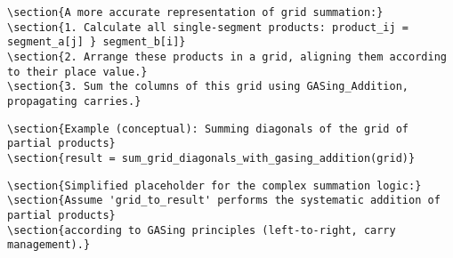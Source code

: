 \begin{verbatim}
\section{A more accurate representation of grid summation:}
\section{1. Calculate all single-segment products: product_ij = segment_a[j] } segment_b[i]}
\section{2. Arrange these products in a grid, aligning them according to their place value.}
\section{3. Sum the columns of this grid using GASing_Addition, propagating carries.}
\end{verbatim}

\begin{verbatim}
\section{Example (conceptual): Summing diagonals of the grid of partial products}
\section{result = sum_grid_diagonals_with_gasing_addition(grid)}
\end{verbatim}

\begin{verbatim}
\section{Simplified placeholder for the complex summation logic:}
\section{Assume 'grid_to_result' performs the systematic addition of partial products}
\section{according to GASing principles (left-to-right, carry management).}
\end{verbatim}
    
